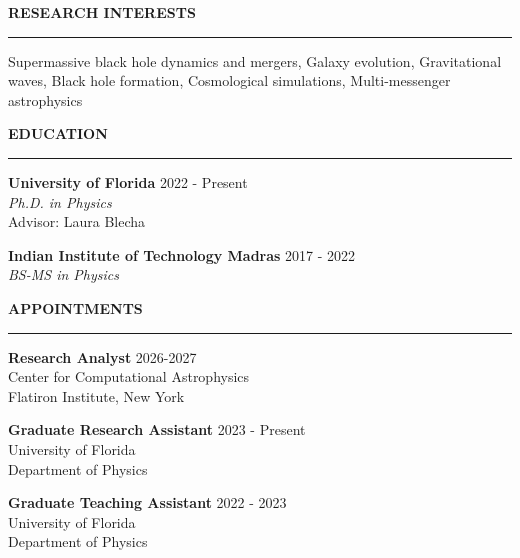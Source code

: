 \documentclass{resume} %
\renewenvironment{rSection}[1]{
\sectionskip
\textbf{\textcolor{C2}{\MakeUppercase{#1}}}
\sectionlineskip
\hrule
\begin{list}{}{
\setlength{\leftmargin}{1.5em}
}
\item[]
}{
\end{list}
}
\begin{document}
\begin{rSection}{Research Interests}
Supermassive black hole dynamics and mergers, Galaxy evolution, Gravitational waves, Black hole formation, Cosmological simulations, Multi-messenger astrophysics

\end{rSection}

\begin{rSection}{Education}

\textbf{University of Florida} \hfill 2022 - Present \\
\emph{Ph.D. in Physics}\\
Advisor: Laura Blecha

\textbf{Indian Institute of Technology Madras} \hfill 2017 - 2022 \\
\emph{BS-MS in Physics}

\end{rSection}

\begin{rSection}{Appointments}

\textbf{Research Analyst
} \hfill 2026-2027 \\
Center for Computational Astrophysics \\
Flatiron Institute, New York


\textbf{Graduate Research Assistant
} \hfill 2023 - Present \\
University of Florida \\
Department of Physics 

\textbf{Graduate Teaching Assistant
} \hfill 2022 - 2023 \\
University of Florida \\
Department of Physics 

\end{rSection}
\end{document}

